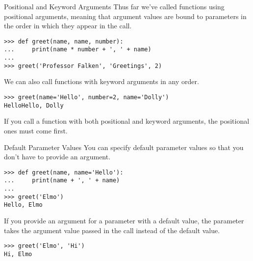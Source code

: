 \documentclass[smaller, aspectratio=1610]{beamer}
\begin{document}
\begin{frame}[label={sec:org0f4b20f},fragile]{Positional and Keyword Arguments}
 Thus far we've called functions using positional arguments, meaning that argument values are bound to parameters in the order in which they appear in the call.

\lstset{language=Python,label= ,caption= ,captionpos=b,numbers=none}
\begin{lstlisting}
>>> def greet(name, name, number):
...     print(name * number + ', ' + name)
...
>>> greet('Professor Falken', 'Greetings', 2)
\end{lstlisting}

We can also call functions with keyword arguments in any order.

\lstset{language=Python,label= ,caption= ,captionpos=b,numbers=none}
\begin{lstlisting}
>>> greet(name='Hello', number=2, name='Dolly')
HelloHello, Dolly
\end{lstlisting}

If you call a function with both positional and keyword arguments, the positional ones must come first.
\end{frame}

\begin{frame}[label={sec:org9bf082c},fragile]{Default Parameter Values}
 You can specify default parameter values so that you don't have to provide an argument.

\lstset{language=Python,label= ,caption= ,captionpos=b,numbers=none}
\begin{lstlisting}
>>> def greet(name, name='Hello'):
...     print(name + ', ' + name)
...
>>> greet('Elmo')
Hello, Elmo
\end{lstlisting}

If you provide an argument for a parameter with a default value, the parameter takes the argument value passed in the call instead of the default value.

\lstset{language=Python,label= ,caption= ,captionpos=b,numbers=none}
\begin{lstlisting}
>>> greet('Elmo', 'Hi')
Hi, Elmo
\end{lstlisting}
\end{frame}
\end{document}
